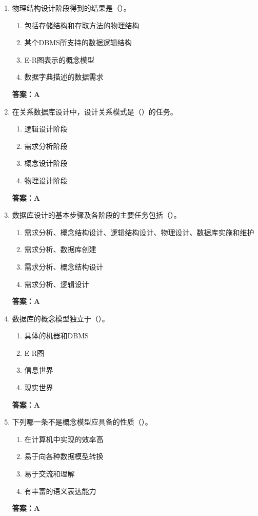 \documentclass[12pt, a4paper]{article}
\begin{document}
\begin{enumerate}[label=\arabic*.]
	\item 物理结构设计阶段得到的结果是（\quad）。
	      \begin{enumerate}
		      \item 包括存储结构和存取方法的物理结构
		      \item 某个DBMS所支持的数据逻辑结构
		      \item E-R图表示的概念模型
		      \item 数据字典描述的数据需求
	      \end{enumerate}
	      \textbf{答案：A}

	\item 在关系数据库设计中，设计关系模式是（\quad）的任务。
	      \begin{enumerate}
		      \item 逻辑设计阶段
		      \item 需求分析阶段
		      \item 概念设计阶段
		      \item 物理设计阶段
	      \end{enumerate}
	      \textbf{答案：A}

	\item 数据库设计的基本步骤及各阶段的主要任务包括（\quad）。
	      \begin{enumerate}
		      \item 需求分析、概念结构设计、逻辑结构设计、物理设计、数据库实施和维护
		      \item 需求分析、数据库创建
		      \item 需求分析、概念结构设计
		      \item 需求分析、逻辑设计
	      \end{enumerate}
	      \textbf{答案：A}

	\item 数据库的概念模型独立于（\quad）。
	      \begin{enumerate}
		      \item 具体的机器和DBMS
		      \item E-R图
		      \item 信息世界
		      \item 现实世界
	      \end{enumerate}
	      \textbf{答案：A}

	\item 下列哪一条不是概念模型应具备的性质（\quad）。
	      \begin{enumerate}
		      \item 在计算机中实现的效率高
		      \item 易于向各种数据模型转换
		      \item 易于交流和理解
		      \item 有丰富的语义表达能力
	      \end{enumerate}
	      \textbf{答案：A}


\end{enumerate}
\end{document}
